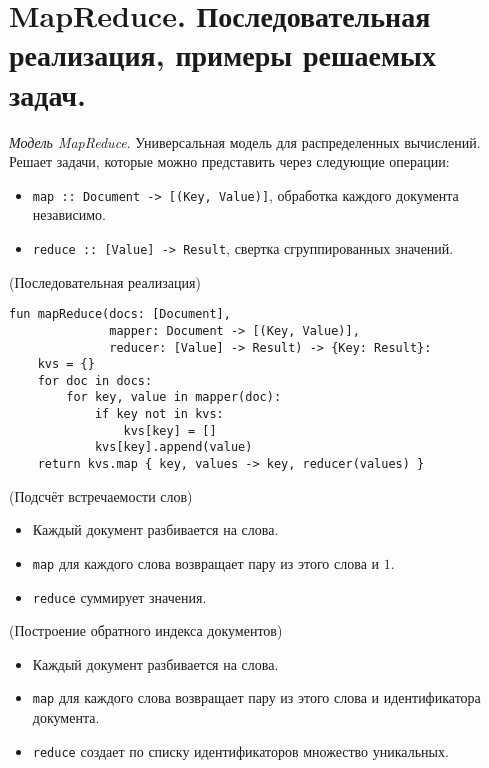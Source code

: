 \section{MapReduce. Последовательная реализация, примеры решаемых задач.}

\begin{definition}
    \textit{Модель MapReduce}. Универсальная модель для распределенных
    вычислений. Решает задачи, которые можно представить через следующие
    операции:
    \begin{itemize}
      \item \texttt{map :: Document -> [(Key, Value)]}, обработка каждого
        документа независимо.
      \item \texttt{reduce :: [Value] -> Result}, свертка сгруппированных
        значений.
    \end{itemize}
\end{definition}


\begin{algorithm}(Последовательная реализация)
  \begin{lstlisting}
fun mapReduce(docs: [Document],
              mapper: Document -> [(Key, Value)],
              reducer: [Value] -> Result) -> {Key: Result}:
    kvs = {}
    for doc in docs:
        for key, value in mapper(doc):
            if key not in kvs:
                kvs[key] = []
            kvs[key].append(value)
    return kvs.map { key, values -> key, reducer(values) }
  \end{lstlisting}
\end{algorithm}

\begin{example}(Подсчёт встречаемости слов)
  \begin{itemize}
    \item Каждый документ разбивается на слова.
    \item \texttt{map} для каждого слова возвращает пару из этого слова и $1$.
    \item \texttt{reduce} суммирует значения.
  \end{itemize}
\end{example}

\begin{example}(Построение обратного индекса документов)
  \begin{itemize}
    \item Каждый документ разбивается на слова.
    \item \texttt{map} для каждого слова возвращает пару из этого слова и
      идентификатора документа.
    \item \texttt{reduce} создает по списку идентификаторов множество
      уникальных.
  \end{itemize}
\end{example}
